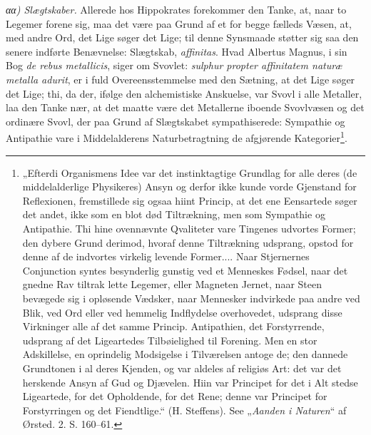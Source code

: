 \documentclass[12pt,a4paper]{book}
\begin{document}
\emph{αα) Slægtskaber.} Allerede hos Hippokrates forekommer den
Tanke, at, naar to Legemer forene sig, maa det være paa Grund af et
for begge fælleds Væsen, at, med andre Ord, det Lige søger det
Lige; til denne Synsmaade støtter sig saa den senere indførte
Benævnelse: Slægtskab, \textit{affinitas}. Hvad Albertus Magnus, i
sin Bog \textit{de rebus metallicis}, siger om Svovlet:
\textit{sulphur propter affinitatem naturæ metalla adurit}, er i
fuld Overeensstemmelse med den Sætning, at det Lige søger det Lige;
thi, da der, ifølge den alchemistiske Anskuelse, var Svovl i alle
Metaller, laa den Tanke nær, at det maatte være det Metallerne
iboende Svovlvæsen og det ordinære Svovl, der paa Grund af
Slægtskabet sympathiserede: Sympathie og Antipathie
\setcounter{footnote}{0}
vare i Middelalderens Naturbetragtning de afgjørende
Kategorier\footnote{„Efterdi Organismens Idee var det
instinktagtige Grundlag for alle deres (de middelalderlige
Physikeres) Ansyn og derfor ikke kunde vorde Gjenstand for
Reflexionen, fremstillede sig ogsaa hiint Princip, at det ene
Eensartede søger det andet, ikke som en blot død Tiltrækning, men
som Sympathie og Antipathie. Thi hine ovennævnte Qvaliteter vare
Tingenes udvortes Former; den dybere Grund derimod, hvoraf denne
Tiltrækning udsprang, opstod for denne af de indvortes virkelig
levende Former.... Naar Stjernernes Conjunction syntes besynderlig
gunstig ved et Menneskes Fødsel, naar det gnedne Rav tiltrak lette
Legemer, eller Magneten Jernet, naar Steen bevægede sig i opløsende
Vædsker, naar Mennesker indvirkede paa andre ved Blik, ved Ord
eller ved hemmelig Indflydelse overhovedet, udsprang disse
Virkninger alle af det samme Princip. Antipathien, det
Forstyrrende, udsprang af det Ligeartedes Tilbøielighed til
Forening. Men en stor Adskillelse, en oprindelig Modsigelse i
Tilværelsen antoge de; den dannede Grundtonen i al deres Kjenden,
og var aldeles af religiøs Art: det var det herskende Ansyn af Gud
og Djævelen. Hiin var Principet for det i Alt stedse Ligeartede,
for det Opholdende, for det Rene; denne var Principet for
Forstyrringen og det Fiendtlige.“ (H. Steffens). See
„\emph{Aanden i Naturen}“ af Ørsted. 2. S. 160--61.}.
\end{document}
